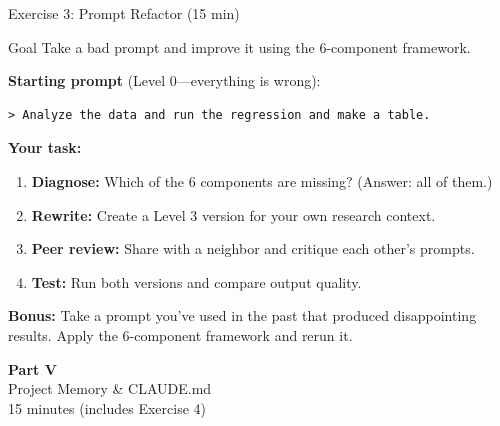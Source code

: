 \documentclass[aspectratio=169,10pt]{beamer}
\begin{document}
\begin{frame}[fragile]{Exercise 3: Prompt Refactor {\small(15 min)}}
\begin{exampleblock}{Goal}
Take a bad prompt and improve it using the 6-component framework.
\end{exampleblock}

\textbf{Starting prompt} (Level 0---everything is wrong):
\begin{lstlisting}[style=prompt, basicstyle=\normalsize\ttfamily]
> Analyze the data and run the regression and make a table.
\end{lstlisting}

\vspace{0.3em}
\textbf{Your task:}
\begin{enumerate}\itemsep2pt
    \item \textbf{Diagnose:} Which of the 6 components are missing? (Answer: all of them.)
    \item \textbf{Rewrite:} Create a Level 3 version for your own research context.
    \item \textbf{Peer review:} Share with a neighbor and critique each other's prompts.
    \item \textbf{Test:} Run both versions and compare output quality.
\end{enumerate}

\vspace{0.2em}
\textbf{Bonus:} Take a prompt you've used in the past that produced disappointing results. Apply the 6-component framework and rerun it.
\end{frame}


\begin{frame}{}
\vfill
\begin{center}
{\Huge \textcolor{uzhblue}{\textbf{Part V}}}\\[12pt]
{\LARGE Project Memory \& CLAUDE.md}\\[6pt]
{\small 15 minutes (includes Exercise 4)}
\end{center}
\vfill
\end{frame}
\end{document}
